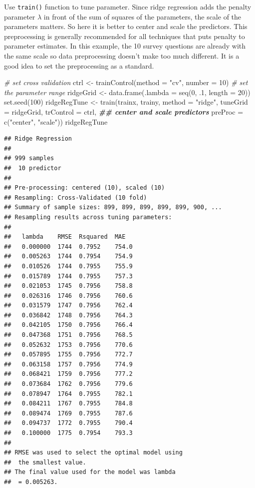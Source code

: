 \documentclass[
  12pt,
]{krantz}
\makeatletter
\newenvironment{Shaded}{\begin{snugshade}}{\end{snugshade}}
\newcommand{\AttributeTok}[1]{\textcolor[rgb]{0.61,0.61,0.61}{#1}}
\newcommand{\CommentTok}[1]{\textcolor[rgb]{0.37,0.37,0.37}{\textit{#1}}}
\newcommand{\DecValTok}[1]{\textcolor[rgb]{0.06,0.06,0.06}{#1}}
\newcommand{\DocumentationTok}[1]{\textcolor[rgb]{0.37,0.37,0.37}{\textbf{\textit{#1}}}}
\newcommand{\FunctionTok}[1]{\textcolor[rgb]{0,0,0}{#1}}
\newcommand{\NormalTok}[1]{#1}
\newcommand{\OtherTok}[1]{\textcolor[rgb]{0.37,0.37,0.37}{#1}}
\newcommand{\StringTok}[1]{\textcolor[rgb]{0.5,0.5,0.5}{#1}}
\newenvironment{kframe}{%
\medskip{}
\setlength{\fboxsep}{.8em}
 \def\at@end@of@kframe{}%
 \ifinner\ifhmode%
  \def\at@end@of@kframe{\end{minipage}}%
  \begin{minipage}{\columnwidth}%
 \fi\fi%
 \def\FrameCommand##1{\hskip\@totalleftmargin \hskip-\fboxsep
 \colorbox{shadecolor}{##1}\hskip-\fboxsep
     \hskip-\linewidth \hskip-\@totalleftmargin \hskip\columnwidth}%
 \MakeFramed {\advance\hsize-\width
   \@totalleftmargin\z@ \linewidth\hsize
   \@setminipage}}%
 {\par\unskip\endMakeFramed%
 \at@end@of@kframe}
\renewenvironment{Shaded}{\begin{kframe}}{\end{kframe}}
\makeatother
\begin{document}
Use \texttt{train()} function to tune parameter. Since ridge regression adds the penalty parameter \(\lambda\) in front of the sum of squares of the parameters, the scale of the parameters matters. So here it is better to center and scale the predictors. This preprocessing is generally recommended for all techniques that puts penalty to parameter estimates. In this example, the 10 survey questions are already with the same scale so data preprocessing doesn't make too much different. It is a good idea to set the preprocessing as a standard.

\begin{Shaded}
\begin{Highlighting}[]
\CommentTok{\# set cross validation}
\NormalTok{ctrl }\OtherTok{\textless{}{-}} \FunctionTok{trainControl}\NormalTok{(}\AttributeTok{method =} \StringTok{"cv"}\NormalTok{, }\AttributeTok{number =} \DecValTok{10}\NormalTok{)}
\CommentTok{\# set the parameter range }
\NormalTok{ridgeGrid }\OtherTok{\textless{}{-}} \FunctionTok{data.frame}\NormalTok{(}\AttributeTok{.lambda =} \FunctionTok{seq}\NormalTok{(}\DecValTok{0}\NormalTok{, .}\DecValTok{1}\NormalTok{, }\AttributeTok{length =} \DecValTok{20}\NormalTok{))}
\FunctionTok{set.seed}\NormalTok{(}\DecValTok{100}\NormalTok{)}
\NormalTok{ridgeRegTune }\OtherTok{\textless{}{-}} \FunctionTok{train}\NormalTok{(trainx, trainy,}
                      \AttributeTok{method =} \StringTok{"ridge"}\NormalTok{,}
                      \AttributeTok{tuneGrid =}\NormalTok{ ridgeGrid,}
                      \AttributeTok{trControl =}\NormalTok{ ctrl,}
                      \DocumentationTok{\#\# center and scale predictors}
                      \AttributeTok{preProc =} \FunctionTok{c}\NormalTok{(}\StringTok{"center"}\NormalTok{, }\StringTok{"scale"}\NormalTok{))}
\NormalTok{ridgeRegTune}
\end{Highlighting}
\end{Shaded}

\begin{verbatim}
## Ridge Regression 
## 
## 999 samples
##  10 predictor
## 
## Pre-processing: centered (10), scaled (10) 
## Resampling: Cross-Validated (10 fold) 
## Summary of sample sizes: 899, 899, 899, 899, 899, 900, ... 
## Resampling results across tuning parameters:
## 
##   lambda    RMSE  Rsquared  MAE  
##   0.000000  1744  0.7952    754.0
##   0.005263  1744  0.7954    754.9
##   0.010526  1744  0.7955    755.9
##   0.015789  1744  0.7955    757.3
##   0.021053  1745  0.7956    758.8
##   0.026316  1746  0.7956    760.6
##   0.031579  1747  0.7956    762.4
##   0.036842  1748  0.7956    764.3
##   0.042105  1750  0.7956    766.4
##   0.047368  1751  0.7956    768.5
##   0.052632  1753  0.7956    770.6
##   0.057895  1755  0.7956    772.7
##   0.063158  1757  0.7956    774.9
##   0.068421  1759  0.7956    777.2
##   0.073684  1762  0.7956    779.6
##   0.078947  1764  0.7955    782.1
##   0.084211  1767  0.7955    784.8
##   0.089474  1769  0.7955    787.6
##   0.094737  1772  0.7955    790.4
##   0.100000  1775  0.7954    793.3
## 
## RMSE was used to select the optimal model using
##  the smallest value.
## The final value used for the model was lambda
##  = 0.005263.
\end{verbatim}
\end{document}
